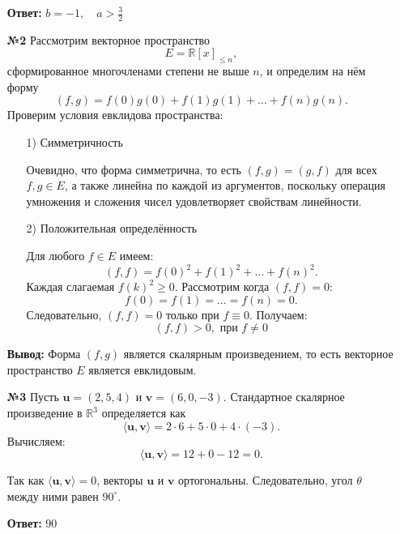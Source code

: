 \documentclass[a4paper]{article}
\renewcommand{\f}[2]{\frac{#1}{#2}}
\renewcommand{\leq}{\leqslant}
\begin{document}
\begin{enumerate}
    \textbf{Ответ: } $b= -1, \quad a > \f{3}{2}$\\

    \item[\textbf{№2}]
    Рассмотрим векторное пространство
    \[
    E = \mathbb{R}[x]_{\leq n},
    \]
    сформированное многочленами степени не выше \( n \), и определим на нём форму
    \[
    (f,g) = f(0)g(0) + f(1)g(1) + \dots + f(n)g(n).
    \]
    Проверим условия евклидова пространства:
    \begin{enumerate}
        \item[1)]Симметричность
        
        Очевидно, что форма симметрична, то есть \( (f,g) = (g,f) \) для всех \( f, g \in E \), а также линейна по каждой из аргументов, поскольку операция умножения и сложения чисел удовлетворяет свойствам линейности.
    
        \item[2)]Положительная определённость
        
        Для любого \( f \in E \) имеем:
        \[
        (f,f) = f(0)^2 + f(1)^2 + \dots + f(n)^2.
        \]
        Каждая слагаемая \( f(k)^2 \ge 0 \). Рассмотрим когда $(f, f) = 0$:
        \[
        f(0) = f(1) = \dots = f(n) = 0.
        \]
        Следовательно,  $(f, f) = 0$ только при $f \equiv 0$. Получаем:
        $$(f,f) > 0, \text{ при } f \neq 0$$
        
    \end{enumerate}

    \textbf{Вывод:} Форма \( (f, g) \) является скалярным произведением, то есть векторное пространство \( E \) является евклидовым.\\

    \item[\textbf{№3}]
    Пусть \( \mathbf{u} = (2, 5, 4) \) и \( \mathbf{v} = (6, 0, -3) \). Стандартное скалярное произведение в \(\mathbb{R}^3\) определяется как
    \[
    \langle \mathbf{u}, \mathbf{v} \rangle = 2\cdot 6 + 5\cdot 0 + 4\cdot (-3).
    \]
    Вычисляем:
    \[
    \langle \mathbf{u}, \mathbf{v} \rangle = 12 + 0 - 12 = 0.
    \]
    
    Так как \(\langle \mathbf{u}, \mathbf{v} \rangle = 0\), векторы \(\mathbf{u}\) и \(\mathbf{v}\) ортогональны. Следовательно, угол \(\theta\) между ними равен \(90^\circ\).
    
    \textbf{Ответ: } $90$\\


\end{enumerate}
\end{document}
